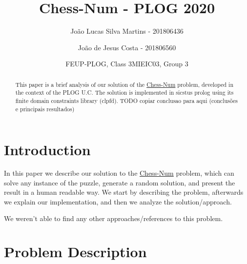 \documentclass[runningheads]{llncs}
\begin{document}
%
\title{Chess-Num - PLOG 2020}
%
%
\author{João Lucas Silva Martins - 201806436 \and João de Jesus Costa - 201806560}
\author{FEUP-PLOG, Class 3MIEIC03, Group 3}

\maketitle

\begin{abstract}
This paper is a brief analysis of our solution of the 
\href{https://erich-friedman.github.io/puzzle/chessnum/}{Chess-Num} problem, developed
in the context of the PLOG U.C. The solution is implemented in sicstus prolog using its
finite domain constraints library (clpfd).
TODO copiar conclusao para aqui (conclusões e principais resultados)

\end{abstract}

\section{Introduction}

In this paper we describe our solution to the \href{https://erich-friedman.github.io/puzzle/chessnum/}{Chess-Num}
problem, which can solve any instance of the puzzle, generate a random solution, and
present the result in a human readable way.
We start by describing the problem, afterwards we explain our implementation, and 
then we analyze the solution/approach.

We weren't able to find any other approaches/references to this problem.

\section{Problem Description}
\end{document}
